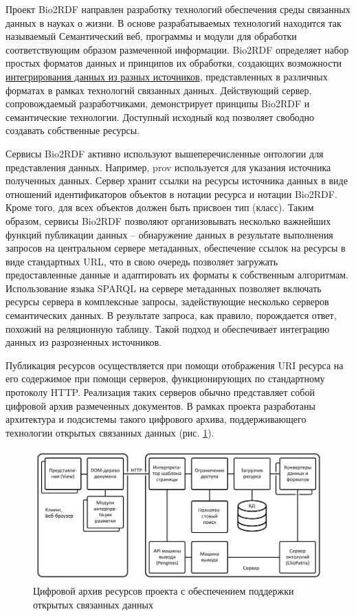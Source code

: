 \documentclass[a4paper,12pt,openany,final]{extreport}
\def\oldcaption{} \let\oldcaption=\caption
\def\caption{\stepcounter{captionsnum}\oldcaption}
\begin{document}
Проект Bio2RDF направлен разработку технологий обеспечения среды
связанных данных в науках о жизни. В основе разрабатываемых технологий
находится так называемый Семантический веб, программы и модули для
обработки соответствующим образом размеченной информации. Bio2RDF
определяет набор простых форматов данных и принципов их обработки,
создающих возможности
\href{https://docs.google.com/presentation/d/1SG6PFew2CPK1o_jRCYx30DFnuGEEr0uWVKPnz7Uqw5k/pub?start=false\&loop=false\&delayms=3000\&slide=id.p}{{интегрирования
данных из разных источников}}, представленных в различных форматах в
рамках технологий связанных данных. Действующий сервер, сопровождаемый
разработчиками, демонстрирует принципы Bio2RDF и семантические
технологии. Доступный исходный код позволяет свободно создавать
собственные ресурсы.

Сервисы Bio2RDF активно используют вышеперечисленные онтологии для
представления данных. Например, prov используется для указания источника
полученных данных. Сервер хранит ссылки на ресурсы источника данных в
виде отношений идентификаторов объектов в нотации ресурса и нотации
Bio2RDF. Кроме того, для всех объектов должен быть присвоен тип (класс).
Таким образом, сервисы Bio2RDF позволяют организовывать несколько
важнейших функций публикации данных -- обнаружение данных в результате
выполнения запросов на центральном сервере метаданных, обеспечение
ссылок на ресурсы в виде стандартных URL, что в свою очередь позволяет
загружать предоставленные данные и адаптировать их форматы к собственным
алгоритмам. Использование языка SPARQL на сервере метаданных позволяет
включать ресурсы сервера в комплексные запросы, задействующие несколько
серверов семантических данных. В результате запроса, как правило,
порождается ответ, похожий на реляционную таблицу. Такой подход и
обеспечивает интеграцию данных из разрозненных источников.

Публикация ресурсов осуществляется при помощи отображения URI ресурса на
его содержимое при помощи серверов, функционирующих по стандартному
протоколу HTTP. Реализация таких серверов обычно представляет собой
цифровой архив размеченных документов. В рамках проекта разработаны
архитектура и подсистемы такого цифрового архива, поддерживающего
технологии открытых связанных данных (рис.
\href{file://///home/eugeneai/Development/text/Projects/Lin-2017/report-2017/annotation.html\#fig:architecture-LOD}{1}).

\begin{figure}\centering
\includegraphics[width=0.8\linewidth]{media/image18.png}

\caption{Цифровой архив ресурсов проекта с обеспечением поддержки
  открытых связанных данных}
\end{figure}
\end{document}
